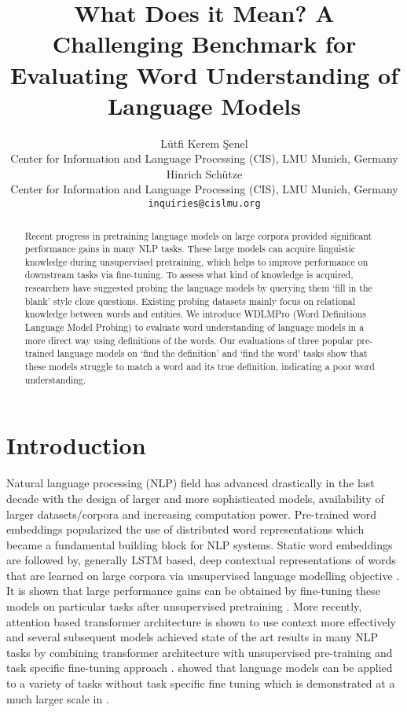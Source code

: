 \documentclass[11pt,a4paper]{article}
\title{What Does it Mean? A Challenging Benchmark for Evaluating Word Understanding of Language Models}
\author{Lütfi Kerem Şenel \\
  Center for Information and Language Processing (CIS), LMU Munich, Germany \\
  Hinrich Schütze \\
    Center for Information and Language Processing (CIS), LMU Munich, Germany \\
  \texttt{inquiries@cislmu.org} \\
  }
\date{}
\begin{document}
\maketitle
\begin{abstract}

Recent progress in pretraining language models on large corpora provided significant performance gains in many NLP tasks. These large models can acquire linguistic knowledge during unsupervised pretraining, which helps to improve performance on downstream tasks via fine-tuning. To assess what kind of knowledge is acquired, researchers have suggested probing the language models by querying them `fill in the blank' style cloze questions. Existing probing datasets mainly focus on relational knowledge between words and entities. We introduce WDLMPro (Word Definitions Language Model Probing) to evaluate word understanding of language models in a more direct way using definitions of the words. Our evaluations of three popular pre-trained language models on `find the definition' and `find the word' tasks show that these models struggle to match a word and its true definition, indicating a poor word understanding.

\end{abstract}

\section{Introduction}

Natural language processing (NLP) field has advanced drastically in the last decade with the design of larger and more sophisticated models, availability of larger datasets/corpora and increasing computation power. Pre-trained word embeddings \cite{mikolov13word2vec_b, pennington14glove} popularized the use of distributed word representations which became a fundamental building block for NLP systems. Static word embeddings are followed by, generally LSTM based, deep contextual representations of words that are learned on large corpora via unsupervised language modelling objective \cite{peters18ELMO}. It is shown that large performance gains can be obtained by fine-tuning these models on particular tasks after unsupervised pretraining \cite{radford18fineTuning, howard18ULMFiT}. More recently, attention based transformer architecture is shown to use context more effectively \cite{vaswani17transformers} and several subsequent models achieved state of the art results in many NLP tasks by combining transformer architecture with unsupervised pre-training and task specific fine-tuning approach \cite{devlin19BERT, liu19RoBERTa}. \cite{Radford19GPT2} showed that language models can be applied to a variety of tasks without task specific fine tuning which is demonstrated at a much larger scale in \cite{brown20GPT3}. 
\end{document}
